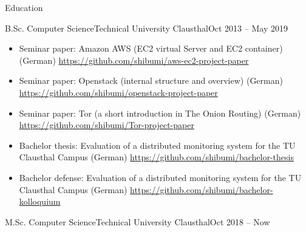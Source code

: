 \documentclass[]{mcdowellcv}
\begin{document}
\begin{cvsection}{Education}
\begin{cvsubsection}{B.Sc. Computer Science}{Technical University Clausthal}{Oct 2013 -- May 2019}
\begin{itemize}
\item Seminar paper: Amazon AWS (EC2 virtual Server and EC2 container) (German) \url{https://github.com/shibumi/aws-ec2-project-paper}
\item Seminar paper: Openstack (internal structure and overview) (German) \url{https://github.com/shibumi/openstack-project-paper}
\item Seminar paper: Tor (a short introduction in The Onion Routing) (German) \url{https://github.com/shibumi/Tor-project-paper}
\item Bachelor thesis: Evaluation of a distributed monitoring system for the TU Clausthal Campus (German) \url{https://github.com/shibumi/bachelor-thesis}
\item Bachelor defense: Evaluation of a distributed monitoring system for the TU Clausthal Campus (German) \url{https://github.com/shibumi/bachelor-kolloquium}
\end{itemize}
\end{cvsubsection}
\begin{cvsubsection}{M.Sc. Computer Science}{Technical University Clausthal}{Oct 2018 -- Now}
\end{cvsubsection}

\end{cvsection}
\end{document}

